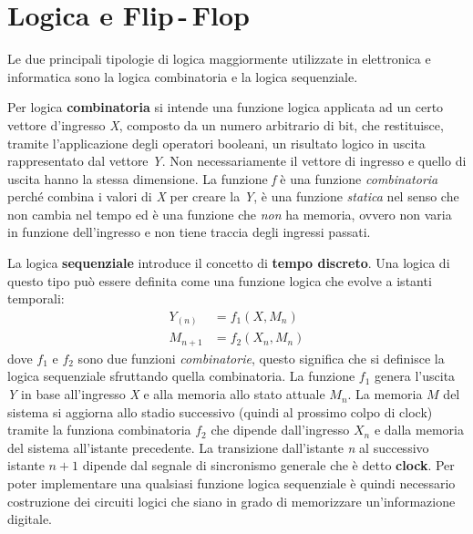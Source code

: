 \documentclass[12pt, a4paper]{report}
\begin{document}
\chapter{Logica e Flip\,-\,Flop}
Le due principali tipologie di logica maggiormente utilizzate in elettronica e informatica sono la logica combinatoria e la logica sequenziale.

Per logica \textbf{combinatoria} si intende una funzione logica applicata ad un certo vettore d'ingresso \textit{X}, composto da un numero arbitrario di bit, che restituisce, tramite l'applicazione degli operatori booleani, un risultato logico in uscita rappresentato dal vettore \textit{Y}. Non necessariamente il vettore di ingresso e quello di uscita hanno la stessa dimensione. La funzione \textit{f} è una funzione \textit{combinatoria} perché combina i valori di \textit{X} per creare la \textit{Y}, è una funzione \textit{statica} nel senso che non cambia nel tempo ed è una funzione che \textit{non} ha memoria, ovvero non varia in funzione dell'ingresso e non tiene traccia degli ingressi passati.

La logica \textbf{sequenziale} introduce il concetto di \textbf{tempo discreto}. Una logica di questo tipo può essere definita come una funzione logica che evolve a istanti temporali:
\begin{align*}
    Y_{(n)} &= f_{1}(X, M_{n})\\
    M_{n+1} &= f_{2}(X_{n}, M_{n})
\end{align*}
dove $f_1$ e $f_2$ sono due funzioni \textit{combinatorie}, questo significa che si definisce la logica sequenziale sfruttando quella combinatoria. La funzione $f_1$ genera l'uscita \textit{Y} in base all'ingresso \textit{X} e alla memoria allo stato attuale $M_n$. La memoria $M$ del sistema si aggiorna allo stadio successivo (quindi al prossimo colpo di clock) tramite la funziona combinatoria $f_2$ che dipende dall'ingresso $X_n$ e dalla memoria del sistema all'istante precedente. La transizione dall'istante \textit{n} al successivo istante $n + 1$ dipende dal segnale di sincronismo generale che è detto \textbf{clock}. Per poter implementare una qualsiasi funzione logica sequenziale è quindi necessario costruzione dei circuiti logici che siano in grado di memorizzare un'informazione digitale.
\end{document}
